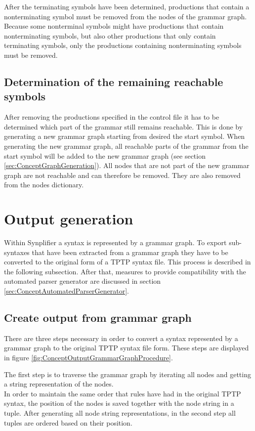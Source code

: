 After the terminating symbols have been determined, productions that contain a nonterminating symbol must be removed from the nodes of the grammar graph. Because some nonterminal symbols might have productions that contain nonterminating symbols, but also other productions that only contain terminating symbols, only the productions containing nonterminating symbols must be removed.

\subsection{Determination of the remaining reachable symbols}\label{sec:ConceptDerterminingRemainingReachable}

After removing the productions specified in the control file it has to be determined which part of the grammar still remains reachable.
This is done by generating a new grammar graph starting from desired the start symbol.
When generating the new grammar graph, all reachable parts of the grammar from the start symbol will be added to the new grammar graph (see section \ref{sec:ConceptGraphGeneration}).
All nodes that are not part of the new grammar graph are not reachable and can therefore be removed. They are also removed from the nodes dictionary.

\section{Output generation}\label{sec:ConceptOutputGeneration}

Within \ac{Synplifier} a syntax is represented by a grammar graph.
To export sub-syntaxes that have been extracted from a grammar graph they have to be converted to the original form of a \ac{TPTP} syntax file. This process is described in the following subsection.
After that, measures to provide compatibility with the automated parser generator are discussed in section \ref{sec:ConceptAutomatedParserGenerator}.

\subsection{Create output from grammar graph}\label{sec:ConceptOutputGrammarGraph}

There are three steps necessary in order to convert a syntax represented by a grammar graph to the original \ac{TPTP} syntax file form. These steps are displayed in figure \ref{fig:ConceptOutputGrammarGraphProcedure}.

The first step is to traverse the grammar graph by iterating all nodes and getting a string representation of the nodes.\\
In order to maintain the same order that rules have had in the original \ac{TPTP} syntax, the position of the nodes is saved together with the node string in a tuple. 
After generating all node string representations, in the second step all tuples are ordered based on their position. 

